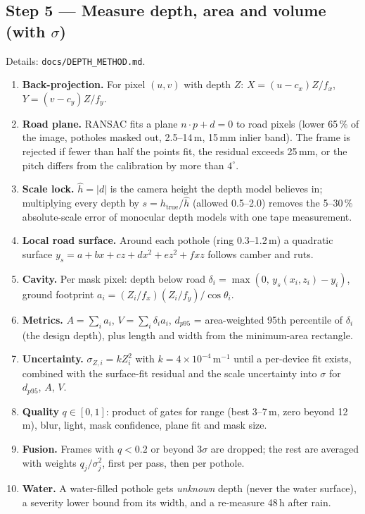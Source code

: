 \documentclass[11pt,a4paper]{article}
\newcommand{\code}[1]{\texttt{\small #1}}
\begin{document}
\subsection{Step 5 --- Measure depth, area and volume (with \texorpdfstring{$\sigma$}{sigma})}
Details: \code{docs/DEPTH\_METHOD.md}.
\begin{enumerate}
  \item \textbf{Back-projection.} For pixel $(u,v)$ with depth $Z$: $X=(u-c_x)Z/f_x$, $Y=(v-c_y)Z/f_y$.
  \item \textbf{Road plane.} RANSAC fits a plane $n\cdot p + d = 0$ to road pixels (lower 65\,\% of the image,
        potholes masked out, 2.5--14\,m, 15\,mm inlier band). The frame is rejected if fewer than half the points fit,
        the residual exceeds 25\,mm, or the pitch differs from the calibration by more than $4^\circ$.
  \item \textbf{Scale lock.} $\hat h=|d|$ is the camera height the depth model believes in; multiplying every depth by
        $s=h_{\text{true}}/\hat h$ (allowed 0.5--2.0) removes the 5--30\,\% absolute-scale error of monocular depth
        models with one tape measurement.
  \item \textbf{Local road surface.} Around each pothole (ring 0.3--1.2\,m) a quadratic surface
        $y_s=a+bx+cz+dx^2+ez^2+fxz$ follows camber and ruts.
  \item \textbf{Cavity.} Per mask pixel: depth below road $\delta_i=\max(0,\,y_s(x_i,z_i)-y_i)$, ground footprint
        $a_i=(Z_i/f_x)(Z_i/f_y)/\cos\theta_i$.
  \item \textbf{Metrics.} $A=\sum_i a_i$, $V=\sum_i \delta_i a_i$, $d_{p95}$ = area-weighted 95th percentile of
        $\delta_i$ (the design depth), plus length and width from the minimum-area rectangle.
  \item \textbf{Uncertainty.} $\sigma_{Z,i}=k Z_i^2$ with $k=4\times10^{-4}\,\text{m}^{-1}$ until a per-device fit
        exists, combined with the surface-fit residual and the scale uncertainty into $\sigma$ for $d_{p95}$, $A$, $V$.
  \item \textbf{Quality} $q\in[0,1]$: product of gates for range (best 3--7\,m, zero beyond 12\,m), blur, light, mask
        confidence, plane fit and mask size.
  \item \textbf{Fusion.} Frames with $q<0.2$ or beyond $3\sigma$ are dropped; the rest are averaged with weights
        $q_j/\sigma_j^2$, first per pass, then per pothole.
  \item \textbf{Water.} A water-filled pothole gets \emph{unknown} depth (never the water surface), a severity lower
        bound from its width, and a re-measure 48\,h after rain.
\end{enumerate}
\end{document}
